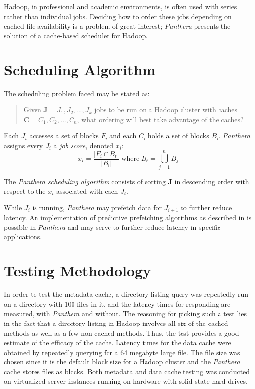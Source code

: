 \documentclass[12pt]{article}
\begin{document}
Hadoop, in professional and academic environments, is often used with series rather than individual jobs. Deciding how to order these jobs depending on cached file availability is a problem of great interest; \textit{Panthera} presents the solution of a cache-based scheduler for Hadoop.

\section{Scheduling Algorithm} \label{scheduler-section}

The scheduling problem faced may be stated as: 

\begin{quote}
Given $\mathbf{J} = J_1, J_2, ... ,J_k$ jobs to be run on a Hadoop cluster with caches $\mathbf{C} = C_1, C_2, ..., C_n$, what ordering will best take advantage of the caches?
\end{quote}

Each $J_i$ accesses a set of blocks $F_i$ and each $C_i$ holds a set of blocks $B_i$. \textit{Panthera} assigns every $J_i$ a \textit{job score}, denoted $x_i$:
			\begin{equation}
				x_i = \displaystyle{\frac{\left\vert{F_i \cap B_t}\right\vert}{ \left\vert{B_t}\right\vert}} \; \textrm{where} \;
				B_t = \bigcup_{j = 1}^{n} B_j
			\end{equation}
			
			The \textit{Panthera scheduling algorithm} consists of sorting $\mathbf{J}$ in descending order with respect to the $x_i$ associated
			with each $J_i$. 
			
		While $J_i$ is running, \textit{Panthera} may prefetch data for $J_{i+1}$ to further reduce latency. An implementation of predictive prefetching algorithms as described in \cite{griffioen1994reducing} is possible in \textit{Panthera} and may serve to further reduce latency in specific applications.
		
\section{Testing Methodology}

In order to test the metadata cache, a directory listing query was repeatedly run on a directory with 100 files in it, and the latency times for responding are measured, with \textit{Panthera} and without. The reasoning for picking such a test lies in the fact that a directory listing in Hadoop involves all six of the cached methods as well as a few non-cached methods. Thus, the test provides a good estimate of the efficacy of the cache. Latency times for the data cache were obtained by repeatedly querying for a 64 megabyte large file. The file size was chosen since it is the default block size for a Hadoop cluster and the \textit{Panthera} cache stores files as blocks. Both metadata and data cache testing was conducted on virtualized server instances running on hardware with solid state hard drives. 
\end{document}
